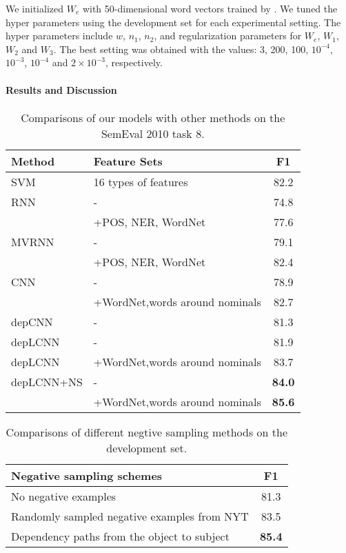 \documentclass[11pt,a4paper]{article}
\begin{document}
We initialized $W_e$ with 50-dimensional word vectors trained by .
We tuned the hyper parameters using the development set for each experimental setting. The hyper parameters include $w$, $n_1$, $n_2$, and regularization parameters for $W_e$, $W_1$, $W_2$ and $W_3$. The best setting was obtained with the values: 3, 200, 100, $10^{-4}$, $10^{-3}$, $10^{-4}$ and $2\times 10^{-3}$, respectively.

\paragraph{Results and Discussion}
\begin{table}
\small
\centering
\begin{tabular}{l|l|c}
\hline
Method & Feature Sets & F1 \\
\hline
\hline
SVM & 16 types of features & 82.2 \\
\hline
RNN & - & 74.8 \\
& +POS, NER, WordNet & 77.6 \\
\hline
MVRNN & - & 79.1 \\
 & +POS, NER, WordNet & 82.4 \\
\hline
CNN & - & 78.9 \\
{\tiny \cite{zeng-EtAl:2014:Coling}}& +WordNet,words around nominals & 82.7 \\\hline
depCNN & - & 81.3\\
depLCNN & - & 81.9\\
depLCNN & +WordNet,words around nominals & 83.7 \\
depLCNN+NS & - & \textbf{84.0} \\
& +WordNet,words around nominals & \textbf{85.6} \\
\hline
\end{tabular}
\caption{Comparisons of our models with other methods on the SemEval 2010 task 8.}
\label{tab:results}
\end{table}

\begin{table}
\small
\centering
\begin{tabular}{l|c}
\hline
Negative sampling schemes & F1 \\
\hline
No negative examples & 81.3\\
\hline
Randomly sampled negative examples from NYT &  83.5\\
\hline
Dependency paths from the object to subject &  \textbf{85.4}\\
\hline
\end{tabular}
\caption{Comparisons of different negtive sampling methods on the development set.}
\label{tab:results_2}
\end{table}
\end{document}
